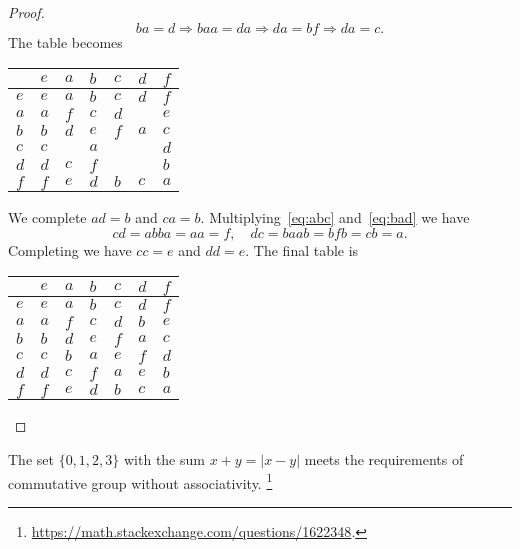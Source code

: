 \begin{proof}
  \begin{equation} \nonumber
    ba = d \Rightarrow baa = da \Rightarrow da = bf \Rightarrow da = c.
  \end{equation}
  The table becomes
  \begin{center}
  \begin{tabular}{l|llllll}
        & $e$ & $a$ & $b$ & $c$ & $d$ & $f$ \\ \hline
    $e$ & $e$ & $a$ & $b$ & $c$ & $d$ & $f$ \\
    $a$ & $a$ & $f$ & $c$ & $d$ & $ $ & $e$ \\
    $b$ & $b$ & $d$ & $e$ & $f$ & $a$ & $c$ \\
    $c$ & $c$ & $ $ & $a$ & $ $ & $ $ & $d$ \\
    $d$ & $d$ & $c$ & $f$ & $ $ & $ $ & $b$ \\
    $f$ & $f$ & $e$ & $d$ & $b$ & $c$ & $a$ \\
  \end{tabular}
  \end{center}
  We complete $ad = b$ and $ca = b$. Multiplying~\eqref{eq:abc}
  and~\eqref{eq:bad} we have
  \begin{equation} \nonumber
    cd = abba = aa = f, \quad dc = baab = bfb = cb = a.
  \end{equation}
  Completing we have $cc = e$ and $dd = e$. The final table is
  \begin{center}
  \begin{tabular}{l|llllll}
        & $e$ & $a$ & $b$ & $c$ & $d$ & $f$ \\ \hline
    $e$ & $e$ & $a$ & $b$ & $c$ & $d$ & $f$ \\
    $a$ & $a$ & $f$ & $c$ & $d$ & $b$ & $e$ \\
    $b$ & $b$ & $d$ & $e$ & $f$ & $a$ & $c$ \\
    $c$ & $c$ & $b$ & $a$ & $e$ & $f$ & $d$ \\
    $d$ & $d$ & $c$ & $f$ & $a$ & $e$ & $b$ \\
    $f$ & $f$ & $e$ & $d$ & $b$ & $c$ & $a$ \\
  \end{tabular}
  \end{center}
\end{proof}

\begin{note}
  The set $\{0, 1, 2, 3\}$ with the sum $x + y = |x - y|$ meets the
  requirements of commutative group without associativity.
  \footnote{\url{https://math.stackexchange.com/questions/1622348}.}
\end{note}

